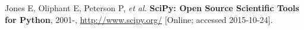\documentclass{article}
\begin{document}

\begin{thebibliography}{9}

    Jones E, Oliphant E, Peterson P, \emph{et al.}
    {\bf SciPy: Open Source Scientific Tools for Python}, 2001-,
    \url{http://www.scipy.org/} [Online; accessed 2015-10-24].

\end{thebibliography}
\end{document}
